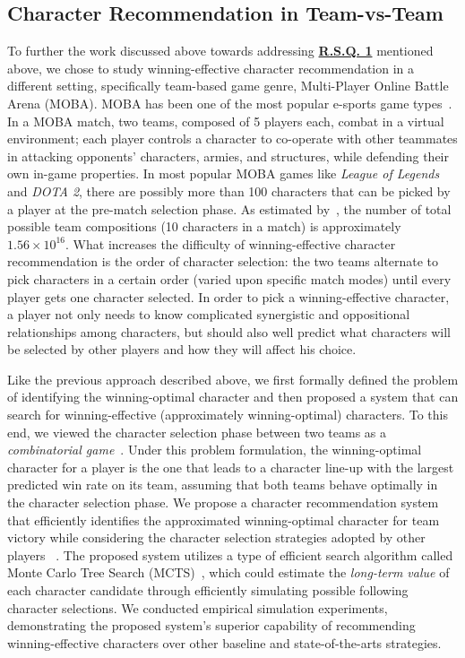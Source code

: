 \subsection{Character Recommendation in Team-vs-Team}\label{sec:thesis_overview:character_recom}

To further the work discussed above towards addressing \hyperref[rq1]{\textbf{R.S.Q. 1}} mentioned above, we chose to study winning-effective character recommendation in a different setting, specifically team-based game genre, Multi-Player Online Battle Arena (MOBA). MOBA has been one of the most popular e-sports game types~\citep{superdata2016}. In a MOBA match, two teams, composed of 5 players each, combat in a virtual environment; each player controls a character to co-operate with other teammates in attacking opponents' characters, armies, and structures, while defending their own in-game properties. In most popular MOBA games like \textit{League of Legends} and \textit{DOTA 2}, there are possibly more than 100 characters that can be picked by a player at the pre-match selection phase. As estimated by~\textcite{hanke2017reco}, the number of total possible team compositions (10 characters in a match) is approximately $1.56 \times 10^{16}$. What increases the difficulty of winning-effective character recommendation is the order of character selection: the two teams alternate to pick characters in a certain order (varied upon specific match modes) until every player gets one character selected. In order to pick a winning-effective character, a player not only needs to know complicated synergistic and oppositional relationships among characters, but should also well predict what characters will be selected by other players and how they will affect his choice. 

Like the previous approach described above, we first formally defined the problem of identifying the winning-optimal character and then proposed a system that can search for winning-effective (approximately winning-optimal) characters. To this end, we viewed the character selection phase between two teams as a \textit{combinatorial game}~\citep{browne2012survey}. Under this problem formulation, the winning-optimal character for a player is the one that leads to a character line-up with the largest predicted win rate on its team, assuming that both teams behave optimally in the character selection phase. We propose a character recommendation system that efficiently identifies the approximated winning-optimal character for team victory while considering the character selection strategies adopted by other players ~\citep{chen2018draft}. The proposed system utilizes a type of efficient search algorithm called Monte Carlo Tree Search (MCTS)~\citep{coulom2006efficient}, which could estimate the \textit{long-term value} of each character candidate through efficiently simulating possible following character selections. We conducted empirical simulation experiments, demonstrating the proposed system's superior capability of recommending winning-effective characters over other baseline and state-of-the-arts strategies. 

